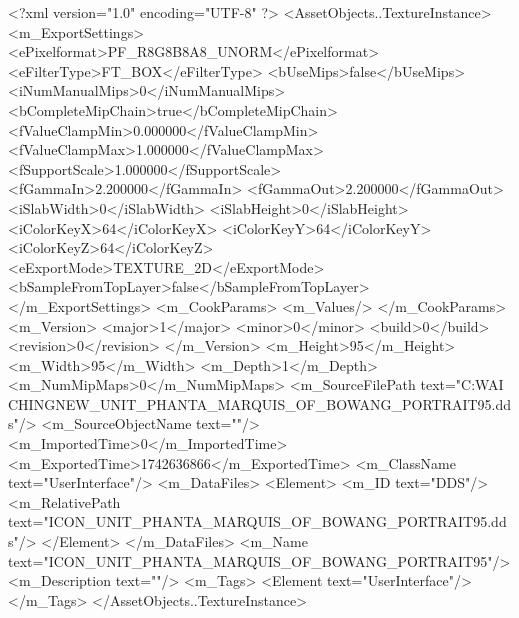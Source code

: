 <?xml version="1.0" encoding="UTF-8" ?>
<AssetObjects..TextureInstance>
	<m_ExportSettings>
		<ePixelformat>PF_R8G8B8A8_UNORM</ePixelformat>
		<eFilterType>FT_BOX</eFilterType>
		<bUseMips>false</bUseMips>
		<iNumManualMips>0</iNumManualMips>
		<bCompleteMipChain>true</bCompleteMipChain>
		<fValueClampMin>0.000000</fValueClampMin>
		<fValueClampMax>1.000000</fValueClampMax>
		<fSupportScale>1.000000</fSupportScale>
		<fGammaIn>2.200000</fGammaIn>
		<fGammaOut>2.200000</fGammaOut>
		<iSlabWidth>0</iSlabWidth>
		<iSlabHeight>0</iSlabHeight>
		<iColorKeyX>64</iColorKeyX>
		<iColorKeyY>64</iColorKeyY>
		<iColorKeyZ>64</iColorKeyZ>
		<eExportMode>TEXTURE_2D</eExportMode>
		<bSampleFromTopLayer>false</bSampleFromTopLayer>
	</m_ExportSettings>
	<m_CookParams>
		<m_Values/>
	</m_CookParams>
	<m_Version>
		<major>1</major>
		<minor>0</minor>
		<build>0</build>
		<revision>0</revision>
	</m_Version>
	<m_Height>95</m_Height>
	<m_Width>95</m_Width>
	<m_Depth>1</m_Depth>
	<m_NumMipMaps>0</m_NumMipMaps>
	<m_SourceFilePath text="C:\Users\YANG WAI CHING\Downloads\CIV\DDS NEW\ICON_UNIT_PHANTA_MARQUIS_OF_BOWANG_PORTRAIT95.dds"/>
	<m_SourceObjectName text=""/>
	<m_ImportedTime>0</m_ImportedTime>
	<m_ExportedTime>1742636866</m_ExportedTime>
	<m_ClassName text="UserInterface"/>
	<m_DataFiles>
		<Element>
			<m_ID text="DDS"/>
			<m_RelativePath text="ICON_UNIT_PHANTA_MARQUIS_OF_BOWANG_PORTRAIT95.dds"/>
		</Element>
	</m_DataFiles>
	<m_Name text="ICON_UNIT_PHANTA_MARQUIS_OF_BOWANG_PORTRAIT95"/>
	<m_Description text=""/>
	<m_Tags>
		<Element text="UserInterface"/>
	</m_Tags>
</AssetObjects..TextureInstance>

